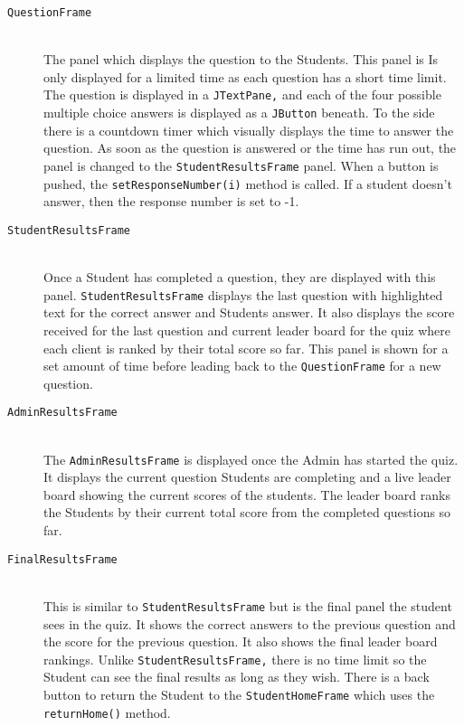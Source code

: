\begin{enumerate}
\begin{description}
        \item[\texttt{QuestionFrame}]\hfill \\ The panel which displays the
            question to the Students. This panel is Is only displayed for a
            limited time as each question has a short time limit. The question
            is displayed in a \texttt{JTextPane,} and each of the four possible
            multiple choice answers is displayed as a \texttt{JButton} beneath.
            To the side there is a countdown timer which visually displays the
            time to answer the question. As soon as the question is answered or
            the time has run out, the panel is changed to the
            \texttt{StudentResultsFrame} panel. When a button is pushed, the
            \verb+setResponseNumber(i)+ method is called. If a student
            doesn't answer, then the response number is set to -1.

        \item[\texttt{StudentResultsFrame}]\hfill \\ Once a Student has
            completed a question, they are displayed with this panel.
            \texttt{StudentResultsFrame} displays the last question with
            highlighted text for the correct answer and Students answer. It
            also displays the score received for the last question and current
            leader board for the quiz where each client is ranked by their
            total score so far. This panel is shown for a set amount of time
            before leading back to the \texttt{QuestionFrame} for a new
            question.

        \item[\texttt{AdminResultsFrame}]\hfill \\ The
            \texttt{AdminResultsFrame} is displayed once the Admin has started
            the quiz. It displays the current question Students are completing
            and a live leader board showing the current scores of the students.
            The leader board ranks the Students by their current total score
            from the completed questions so far.

        \item[\texttt{FinalResultsFrame}]\hfill \\ This is similar to
            \texttt{StudentResultsFrame} but is the final panel the student
            sees in the quiz. It shows the correct answers to the previous
            question and the score for the previous question. It also shows the
            final leader board rankings. Unlike \texttt{StudentResultsFrame,}
            there is no time limit so the Student can see the final results as
            long as they wish. There is a back button to return the Student to
            the \texttt{StudentHomeFrame} which uses the \verb+returnHome()+
            method.


\end{description}
\end{enumerate}
